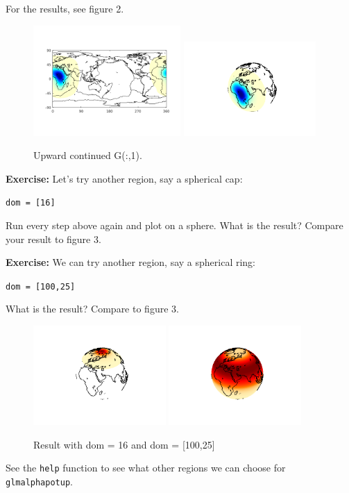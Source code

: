 \documentclass[11pt]{article}
\begin{document}
For the results, see figure 2.
\begin{figure}[H]
  \includegraphics[width=0.5\textwidth]{figures/potupflatml.png}
  \includegraphics[width=0.45\textwidth]{figures/potupml.png}
  \caption{Upward continued G(:,1).}
\label{G(:,1)potup}
\end{figure}

\textbf{Exercise:} Let's try another region, say a spherical cap:

\verb+dom = [16]+

Run every step above again and plot on a sphere.  What is the result?  Compare your result to figure 3.

\textbf{Exercise:} We can try another region, say a spherical ring:

\verb+dom = [100,25]+

What is the result? Compare to figure 3.
\begin{figure}[H]
  \centering
  \includegraphics[width=0.45\textwidth]{figures/dom16ml.png}
  \includegraphics[width=0.45\textwidth]{figures/dom100_25ml.png}
  \caption{Result with dom = 16 and dom = [100,25]}
\label{dom}
\end{figure}
See the \verb+help+ function to see what other regions we can choose for \verb+glmalphapotup+.
\end{document}

